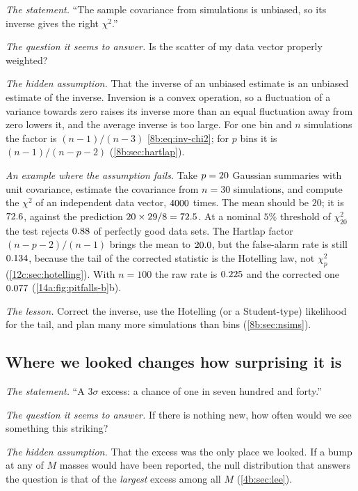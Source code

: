 \emph{The statement.} ``The sample covariance from simulations is unbiased, so its
inverse gives the right $\chi^2$.''

\emph{The question it seems to answer.} Is the scatter of my data vector properly
weighted?

\emph{The hidden assumption.} That the inverse of an unbiased estimate is an unbiased
estimate of the inverse. Inversion is a convex operation, so a fluctuation of a
variance towards zero raises its inverse more than an equal fluctuation away from zero
lowers it, and the average inverse is too large. For one bin and $n$ simulations the
factor is $(n-1)/(n-3)$ \eqref{8b:eq:inv-chi2}; for $p$ bins it is $(n-1)/(n-p-2)$
(\cref{8b:sec:hartlap}).

\emph{An example where the assumption fails.} Take $p=20$ Gaussian summaries with
unit covariance, estimate the covariance from $n=30$ simulations, and compute the $\chi^2$
of an independent data vector, $4000$ times. The mean should be $20$; it is
$72.6$, against the prediction $20\times29/8=72.5$. At a nominal
$5\%$ threshold of $\chi^2_{20}$ the test rejects $0.88$ of perfectly good data
sets. The Hartlap factor $(n-p-2)/(n-1)$ brings the mean to $20.0$, but the
false-alarm rate is still $0.134$, because the tail of the corrected statistic
is the Hotelling law, not $\chi^2_p$ (\cref{12c:sec:hotelling}). With $n=100$ the raw
rate is $0.225$ and the corrected one $0.077$
(\cref{14a:fig:pitfalls-b}b).

\emph{The lesson.} Correct the inverse, use the Hotelling (or a Student-type) likelihood
for the tail, and plan many more simulations than bins (\cref{8b:sec:nsims}).

\subsection{Where we looked changes how surprising it is}\label{14a:sec:pitfall-lee}

\emph{The statement.} ``A $3\sigma$ excess: a chance of one in seven hundred and forty.''

\emph{The question it seems to answer.} If there is nothing new, how often would we see
something this striking?

\emph{The hidden assumption.} That the excess was the only place we looked. If a bump
at any of $M$ masses would have been reported, the null distribution that answers the
question is that of the \emph{largest} excess among all $M$ (\cref{4b:sec:lee}).

